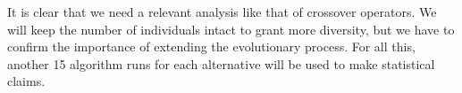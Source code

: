 	It is clear that we need a relevant analysis like that of crossover operators. We will keep the number of individuals intact to grant more diversity, but we have to confirm the importance of extending the evolutionary process. For all this, another 15 algorithm runs for each alternative will be used to make statistical claims.


